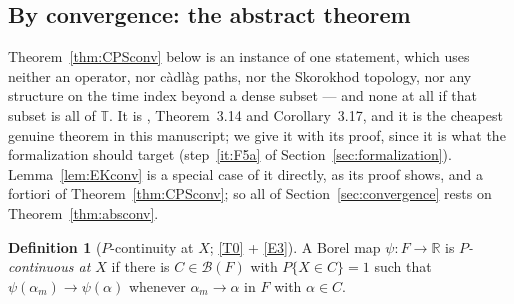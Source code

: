 \documentclass[11pt,a4paper]{article}
\theoremstyle{plain}
\theoremstyle{definition}
\newtheorem{definition}[theorem]{Definition}
\theoremstyle{remark}
\newcommand{\R}{\mathbb{R}}
\newcommand{\T}{\mathbb{T}}                     %
\newcommand{\Bor}{\mathcal{B}}                 %
\newcommand{\CPS}{\cite{CPS23}}
\begin{document}
\subsection{By convergence: the abstract theorem}
\label{ssec:absconv}

Theorem~\ref{thm:CPSconv} below is an instance of one
statement, which uses neither an operator, nor c\`adl\`ag paths, nor the
Skorokhod topology, nor any structure on the time index beyond a dense subset ---
and none at all if that subset is all of $\T$.  It is \CPS, Theorem~3.14 and
Corollary~3.17, and it is the cheapest genuine theorem in this manuscript; we
give it with its proof, since it is what the formalization should target
(step~\ref{it:F5a} of Section~\ref{sec:formalization}).  Lemma~\ref{lem:EKconv}
is a special case of it directly, as its proof shows, and a fortiori of
Theorem~\ref{thm:CPSconv}; so all of Section~\ref{sec:convergence} rests on
Theorem~\ref{thm:absconv}.

\begin{definition}[$P$-continuity at $X$; \eqref{T0} + \eqref{E3}]
  \label{def:Pcont}
  A Borel map $\psi : F \to \R$ is \emph{$P$-continuous at $X$} if there is
  $C \in \Bor(F)$ with $P\{X \in C\} = 1$ such that $\psi(\alpha_m) \to \psi(\alpha)$
  whenever $\alpha_m \to \alpha$ in $F$ with $\alpha \in C$.
\end{definition}
\end{document}
